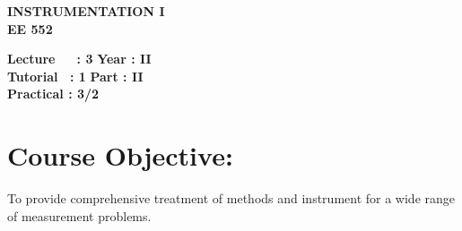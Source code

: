 \begin{center}
    \textbf{\huge{\uppercase{Instrumentation I}}}
    \\
    \vspace{.5cm}
    \textbf{\large{EE 552}}
\end{center}

\noindent\textbf{Lecture\ \ \ : 3} \hfill \textbf{Year : II } \\
\textbf{Tutorial \ : 1} \hfill \textbf{Part : II } \\
\textbf{Practical : 3/2}  \\

\par
\noindent 
\section*{Course Objective:}
To provide comprehensive treatment of methods and instrument for a wide range of measurement problems.


